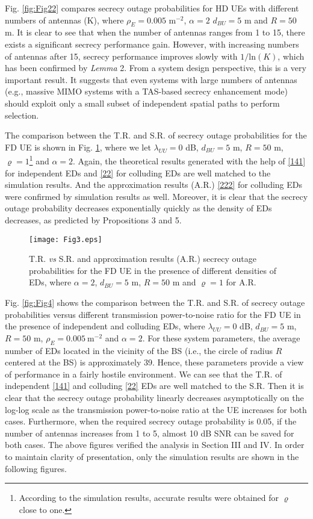 \documentclass[10pt]{IEEEtran}
\begin{document}
Fig. \ref{fig:Fig22} compares secrecy outage probabilities for HD UEs with different numbers of antennas (K), where $\rho_E = 0.005$ $\textrm{m}^{-2}$, $\alpha=2$ $d_{BU} = 5$ m and $R = 50$ m. It is clear to see that when the number of antennas ranges from 1 to 15, there exists a significant secrecy performance gain. However, with increasing numbers of antennas after 15, secrecy performance improves slowly with $1/\textrm{ln}(K)$, which has been confirmed by \textit{Lemma} 2. From a system design perspective, this is a very important result. It suggests that even systems with large numbers of antennas (e.g., massive MIMO systems with a TAS-based secrecy enhancement mode) should exploit only a small subset of independent spatial paths to perform selection.

The comparison between the T.R. and S.R. of secrecy outage probabilities for the FD UE is shown in Fig. \ref{fig:Fig3}, where we let $\lambda_{UU} = 0$ dB, $d_{BU} = 5$ m, $R = 50$ m, $\varrho = 1$\footnote{According to the simulation results, accurate results were obtained for $\varrho$ close to one.} and $\alpha = 2$. Again, the theoretical results generated with the help of \eqref{141} for independent EDs and \eqref{22} for colluding EDs are well matched to the simulation results. And the approximation results (A.R.) \eqref{222} for colluding EDs were confirmed by simulation results as well. Moreover, it is clear that the secrecy outage probability decreases exponentially quickly as the density of EDs decreases, as predicted by Propositions 3 and 5.

\begin{figure}[t]
\centering
\texttt{[image: Fig3.eps]}
\caption{\small T.R. {\em vs} S.R. and approximation results (A.R.) secrecy outage probabilities for the FD UE in the presence of different densities of EDs, where $\alpha = 2$, $d_{BU} = 5$ m, $R = 50$ m and $\varrho = 1$ for A.R.}
\label{fig:Fig3}
\end{figure}

Fig. \ref{fig:Fig4} shows the comparison between the T.R. and S.R. of secrecy outage probabilities versus different transmission power-to-noise ratio for the FD UE in the presence of independent and colluding EDs, where $\lambda_{UU} = 0$ dB, $d_{BU} = 5$ m, $R = 50$ m, $\rho_E = 0.005~\textrm{m}^{-2}$ and $\alpha = 2$. For these system parameters, the average number of EDs located in the vicinity of the BS (i.e., the circle of radius $R$ centered at the BS) is approximately 39. Hence, these parameters provide a view of performance in a fairly hostile environment. We can see that the T.R. of independent \eqref{141} and colluding \eqref{22} EDs are well matched to the S.R. Then it is clear that the secrecy outage probability linearly decreases asymptotically on the log-log scale as the transmission power-to-noise ratio at the UE increases for both cases. Furthermore, when the required secrecy outage probability is 0.05, if the number of antennas increases from 1 to 5, almost 10 dB SNR can be saved for both cases.  The above figures verified the analysis in Section III and IV. In order to maintain clarity of presentation, only the simulation results are shown in the following figures.
\end{document}
